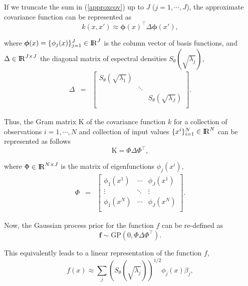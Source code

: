 \documentclass[]{interact}
\theoremstyle{plain}%
\theoremstyle{definition}
\theoremstyle{remark}
\begin{document}
If we truncate the sum in (\ref{approxcov}) up to $J$ ($j=1,\cdots,J$), the approximate covariance function can be represented as
%
\begin{equation}
k(x,x') \approx \boldsymbol{\phi}(x)^\intercal \Delta \boldsymbol{\phi}(x'), \nonumber
\end{equation}

\noindent where $\boldsymbol{\phi}(x)=\{\phi_j(x)\}_{j=1}^{J} \in {\rm I\!R}^{J}$ is the column vector of basis functions, and $\Delta  \in {\rm I\!R}^{J\times J}$ the diagonal matrix of espectral densities $S_{\theta}(\sqrt{\lambda_j})$, 
%
\begin{eqnarray}
\Delta &=&  \begin{bmatrix}
    S_{\theta}(\sqrt{\lambda_1}) & & \\
    & \ddots & \nonumber \\
    & & S_{\theta}(\sqrt{\lambda_J}) \\
  \end{bmatrix}.
\end{eqnarray}

Thus, the Gram matrix $\text{K}$ of the covariance function $k$ for a collection of observations $i=1,\cdots,N$ and collection of input values $\{x^i\}_{i=1}^{N} \in {\rm I\!R}^{N}$ can be represented as follows
%
\begin{equation}
\text{K}= \Phi \Delta \Phi^\intercal, \nonumber
\end{equation}

\noindent where $\Phi \in {\rm I\!R}^{N\times J}$ is the matrix of eigenfunctions $\phi_j(x^i)$,
%
\begin{eqnarray}
\Phi &=&  \left[ {\begin{array}{ccc}
   \phi_1(x^1) & \cdots & \phi_J(x^1)  \\
    \vdots &\ddots & \vdots  \nonumber \\ 
    \phi_1(x^N) & \cdots & \phi_J(x^N) \\
  \end{array} } \right].
\end{eqnarray}
 
\noindent Now, the Gaussian process prior for the function $f$ can be re-defined as
%
\begin{equation}
\mathbf{f} \sim \text{GP}(0,\Phi \Delta \Phi^\intercal). \nonumber
\end{equation}

\noindent This equivalently leads to a linear representation of the function $f$,
%
\begin{equation}\label{approxf}
f(x) \approx \sum_{j} \left( S_{\theta}(\sqrt{\lambda_j})\right)^{1/2} \phi_j(x) \beta_j, \nonumber
\end{equation}
\end{document}

